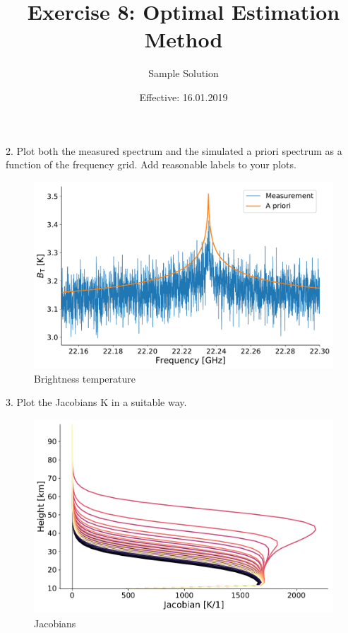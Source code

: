 \documentclass[paper=a4, fontsize=11pt]{scrartcl}
\title{Exercise 8: Optimal Estimation Method}
\author{Sample Solution}
\date{Effective: 16.01.2019}
\begin{document}
\maketitle

2. Plot both the measured spectrum and the simulated a priori spectrum as a
function of the frequency grid. Add reasonable labels to your plots.

\begin{figure}[ht]
  \centering
  \includegraphics[width=\textwidth]{plots/bt_spectrum.pdf}
  \caption{Brightness temperature \label{fig:bt_spectrum}}
\end{figure}

\newpage

3. Plot the Jacobians K in a suitable way.

\begin{figure}[ht]
  \centering
  \includegraphics[width=\textwidth]{plots/jacobians.pdf}
  \caption{Jacobians \label{fig:jacobians}}
\end{figure}
\end{document}
